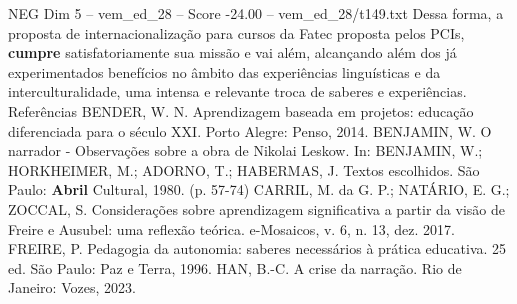 \begin{textsample}{NEG Dim 5 – vem\_ed\_28 – Score -24.00 – vem\_ed\_28/t149.txt}
Dessa forma, a proposta de internacionalização para cursos da Fatec proposta pelos PCIs, \textbf{cumpre} satisfatoriamente sua missão e vai além, alcançando além dos já experimentados benefícios no âmbito das experiências linguísticas e da interculturalidade, uma intensa e relevante troca de saberes e experiências.
Referências BENDER, W.
N.
Aprendizagem baseada em projetos: educação diferenciada para o século XXI.
Porto Alegre: Penso, 2014.
BENJAMIN, W.
O narrador - Observações sobre a obra de Nikolai Leskow.
In: BENJAMIN, W.; HORKHEIMER, M.; ADORNO, T.; HABERMAS, J.
Textos escolhidos.
São Paulo: \textbf{Abril} Cultural, 1980. (p. 57-74) CARRIL, M. da G.
P.; NATÁRIO, E.
G.; ZOCCAL, S.
Considerações sobre aprendizagem significativa a partir da visão de Freire e Ausubel: uma reflexão teórica. e-Mosaicos, v. 6, n. 13, dez. 2017.
FREIRE, P.
Pedagogia da autonomia: saberes necessários à prática educativa. 25 ed.
São Paulo: Paz e Terra, 1996.
HAN, B.-C.
A crise da narração.
Rio de Janeiro: Vozes, 2023.

\end{textsample}
